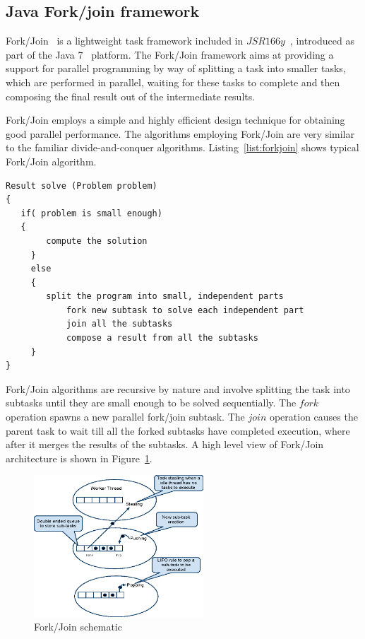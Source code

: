 \documentclass[conference]{IEEEtran}
\begin{document}
\subsection{Java Fork/join framework}
Fork/Join~\cite{bib:java} is a lightweight task framework included in $JSR166y$~\cite{bib:jsr}, introduced as part of the Java 7~\cite{bib:jdk7} platform. The Fork/Join framework aims at providing a support for parallel programming by way of splitting a task into smaller tasks, which are performed in parallel, waiting for these tasks to complete and then composing the final result out of the intermediate results.

Fork/Join employs a simple and highly efficient design technique for obtaining good parallel performance. The algorithms employing Fork/Join are very similar to the familiar divide-and-conquer algorithms. Listing~\ref{list:forkjoin} shows typical Fork/Join algorithm. 

\begin{lstlisting}[caption={Typical Fork/Join algorithm}, label=list:forkjoin]
Result solve (Problem problem) 
{
   if( problem is small enough)
   {
	    compute the solution
	 }		 
	 else
	 {
	    split the program into small, independent parts
			fork new subtask to solve each independent part
			join all the subtasks
			compose a result from all the subtasks
	 }
}
\end{lstlisting}


Fork/Join algorithms are recursive by nature and involve splitting the task into subtasks until they are small enough to be solved sequentially. The $fork$ operation spawns a new parallel fork/join subtask. The $join$ operation causes the parent task to wait till all the forked subtasks have completed execution, where after it merges the results of the subtasks. A high level view of Fork/Join architecture is shown in Figure~\ref{fig:forkjoin}.

\begin{figure}[!t]
\centering
\includegraphics[width=2.5in]{forkjoin.eps}
\caption{Fork/Join schematic}
\label{fig:forkjoin}
\end{figure}
\end{document}
